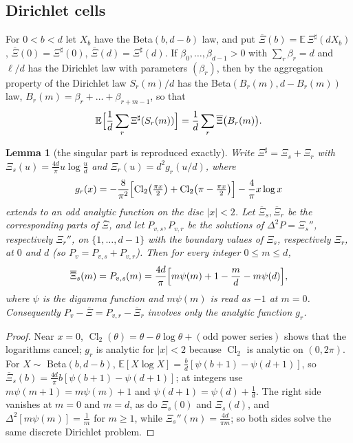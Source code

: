 \documentclass[11pt]{amsart}
\newtheorem{lemma}[theorem]{Lemma}
\theoremstyle{definition}
\theoremstyle{remark}
\numberwithin{equation}{section}
\newcommand{\E}{\mathbb{E}}
\newcommand{\Cl}{\operatorname{Cl}_2}
\newcommand{\Sh}{\Xi^{\sharp}}
\newcommand{\Xb}{\overline{\Xi}}
\begin{document}
\subsection{Dirichlet cells}
For $0<b<d$ let $X_b$ have the Beta$(b,d-b)$ law, and put $\Xb(b)=\E\,\Sh(dX_b)$, $\Xb(0)=\Sh(0)$, $\Xb(d)=\Sh(d)$. If
$\beta_0,\dots,\beta_{d-1}>0$ with $\sum_r\beta_r=d$ and $\ell/d$ has the Dirichlet law with parameters $(\beta_r)$, then by the
aggregation property of the Dirichlet law $S_r(m)/d$ has the Beta$(B_r(m),d-B_r(m))$ law, $B_r(m)=\beta_r+\dots+\beta_{r+m-1}$,
so that
\begin{equation}\label{eq:dirichlet}
\E\Bigl[\frac1d\sum_r\Sh(S_r(m))\Bigr]=\frac1d\sum_r\Xb\bigl(B_r(m)\bigr).
\end{equation}

\begin{lemma}[the singular part is reproduced exactly]\label{lem:singular}
Write $\Sh=\Xi_s+\Xi_r$ with $\Xi_s(u)=\frac{4d}\pi u\log\frac ud$ and $\Xi_r(u)=d^2g_r(u/d)$, where
\[
g_r(x)=-\frac8{\pi^2}\Bigl[\Cl\bigl(\tfrac{\pi x}2\bigr)+\Cl\bigl(\pi-\tfrac{\pi x}2\bigr)\Bigr]-\frac4\pi x\log x
\]
extends to an odd analytic function on the disc $|x|<2$. Let $\Xb_s,\Xb_r$ be the corresponding parts of $\Xb$, and let
$P_{v,s},P_{v,r}$ be the solutions of $\Delta^2P=\Xi_s''$, respectively $\Xi_r''$, on $\{1,\dots,d-1\}$ with the boundary values
of $\Xi_s$, respectively $\Xi_r$, at $0$ and $d$ (so $P_v=P_{v,s}+P_{v,r}$). Then for every integer $0\le m\le d$,
\[
\Xb_s(m)=P_{v,s}(m)=\frac{4d}\pi\Bigl[m\psi(m)+1-\frac md-m\psi(d)\Bigr],
\]
where $\psi$ is the digamma function and $m\psi(m)$ is read as $-1$ at $m=0$. Consequently $P_v-\Xb=P_{v,r}-\Xb_r$
involves only the analytic function $g_r$.
\end{lemma}

\begin{proof}
Near $x=0$, $\Cl(\theta)=\theta-\theta\log\theta+(\text{odd power series})$ shows that the logarithms cancel; $g_r$ is analytic for
$|x|<2$ because $\Cl$ is analytic on $(0,2\pi)$. For $X\sim$ Beta$(b,d-b)$, $\E[X\log X]=\frac bd[\psi(b+1)-\psi(d+1)]$, so
$\Xb_s(b)=\frac{4d}\pi b[\psi(b+1)-\psi(d+1)]$; at integers use $m\psi(m+1)=m\psi(m)+1$ and $\psi(d+1)=\psi(d)+\frac1d$. The right
side vanishes at $m=0$ and $m=d$, as do $\Xi_s(0)$ and $\Xi_s(d)$, and $\Delta^2[m\psi(m)]=\frac1m$ for $m\ge1$, while
$\Xi_s''(m)=\frac{4d}{\pi m}$; so both sides solve the same discrete Dirichlet problem.
\end{proof}
\end{document}
